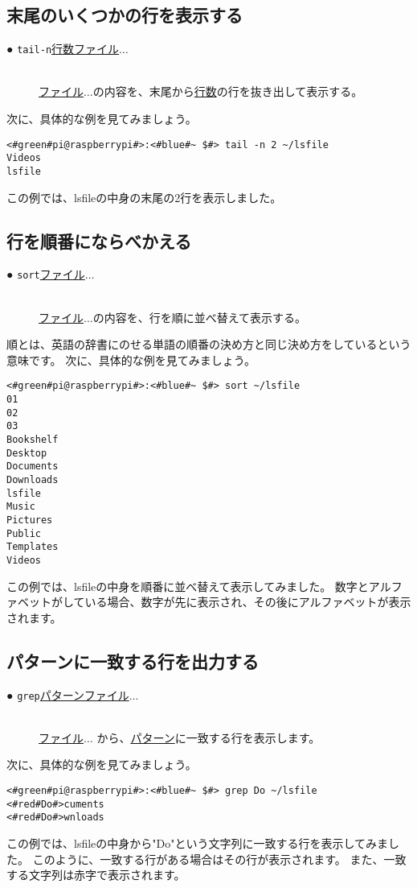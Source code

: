 \subsection{末尾のいくつかの行を表示する}
\begin{description}
    \item[● \texttt{tail}\textvisiblespace \texttt{-n}\textvisiblespace \underline{行数}\textvisiblespace \underline{ファイル}$\ldots$ ]\mbox{}\\
    \underline{ファイル}$\ldots$の内容を、末尾から\underline{行数}の行を抜き出して表示する。
\end{description}
次に、具体的な例を見てみましょう。
\begin{lstlisting}[caption=tailコマンドの実行例, label=shuf_example]
<#green#pi@raspberrypi#>:<#blue#~ $#> tail -n 2 ~/lsfile
Videos
lsfile
\end{lstlisting}
この例では、lsfileの中身の末尾の2行を表示しました。

\subsection{行を順番にならべかえる}
\begin{description}
    \item[● \texttt{sort}\textvisiblespace \underline{ファイル}$\ldots$ ]\mbox{}\\
    \underline{ファイル}$\ldots$の内容を、行を順に並べ替えて表示する。
\end{description}
順とは、英語の辞書にのせる単語の順番の決め方と同じ決め方をしているという意味です。
次に、具体的な例を見てみましょう。
\begin{lstlisting}[caption=sortコマンドの実行例, label=sort_example]
<#green#pi@raspberrypi#>:<#blue#~ $#> sort ~/lsfile
01
02
03
Bookshelf
Desktop
Documents
Downloads
lsfile
Music
Pictures
Public
Templates
Videos
\end{lstlisting}
この例では、lsfileの中身を順番に並べ替えて表示してみました。
数字とアルファベットがしている場合、数字が先に表示され、その後にアルファベットが表示されます。

\subsection{パターンに一致する行を出力する}
\begin{description}
    \item[● \texttt{grep}\textvisiblespace \underline{パターン}\textvisiblespace \underline{ファイル}$\ldots$ ]\mbox{}\\
    \underline{ファイル}$\ldots$ から、\underline{パターン}に一致する行を表示します。
\end{description}
次に、具体的な例を見てみましょう。
\begin{lstlisting}[caption=grepコマンドの実行例, label=grep_example]
<#green#pi@raspberrypi#>:<#blue#~ $#> grep Do ~/lsfile
<#red#Do#>cuments
<#red#Do#>wnloads
\end{lstlisting}
この例では、lsfileの中身から"Do"という文字列に一致する行を表示してみました。
このように、一致する行がある場合はその行が表示されます。
また、一致する文字列は赤字で表示されます。


